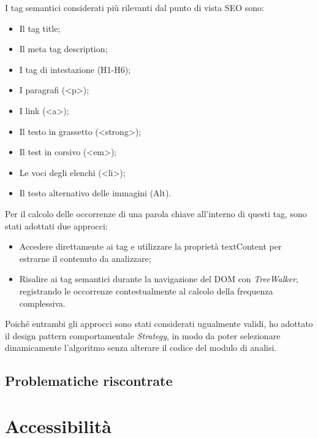 \vspace{10pt}
\par\noindent I tag semantici considerati più rilevanti dal punto di vista SEO sono:
\begin{itemize}
  \item Il tag title;
  \item Il meta tag description;
  \item I tag di intestazione (H1-H6);
  \item I paragrafi (<p>);
  \item I link (<a>);
  \item Il testo in grassetto (<strong>);
  \item Il test in corsivo (<em>);
  \item Le voci degli elenchi (<li>);
  \item Il testo alternativo delle immagini (Alt).
\end{itemize}

\vspace{10pt}
\par\noindent Per il calcolo delle occorrenze di una parola chiave all’interno di questi tag, sono stati adottati due approcci:
\begin{itemize}
  \item Accedere direttamente ai tag e utilizzare la proprietà textContent per estrarne il contenuto da analizzare;
  \item Risalire ai tag semantici durante la navigazione del DOM con \textit{TreeWalker}, registrando le occorrenze contestualmente al calcolo della frequenza complessiva.
\end{itemize}

\vspace{10pt}
\par\noindent Poiché entrambi gli approcci sono stati considerati ugualmente validi, ho adottato il design pattern comportamentale \textit{Strategy}, in modo da poter selezionare dinamicamente l’algoritmo senza alterare il codice del modulo di analisi.

\subsection{Problematiche riscontrate}

\section{Accessibilità}

